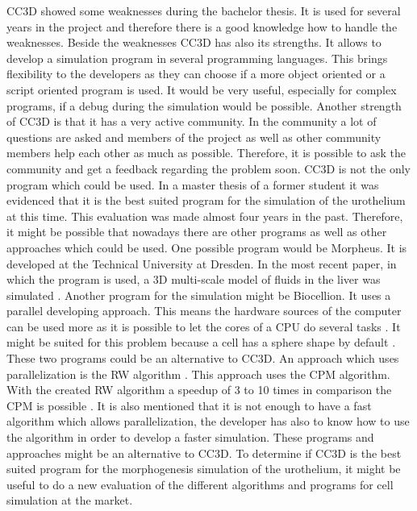 \ac{CC3D} showed some weaknesses during the bachelor thesis. It is used for several years in the project and therefore there is a good knowledge how to handle the weaknesses. Beside the weaknesses \ac{CC3D} has also its strengths. It allows to develop a simulation program in several programming languages.  This brings flexibility to the developers as they can choose if a more object oriented or a script oriented program is used. It would be very useful, especially for complex programs, if a debug during the simulation would be possible. Another strength of \ac{CC3D} is that it has a very active community. In the community a lot of questions are asked and members of the project as well as other community members help each other as much as possible. Therefore, it is possible to ask the community and get a feedback regarding the problem soon. \newline
\ac{CC3D} is not the only program which could be used. In a master thesis of a former student it was evidenced that it is the best suited program for the simulation of the urothelium \cite{MSCAngelo} at this time. This evaluation was made almost four years in the past. Therefore, it might be possible that nowadays there are other programs as well as other approaches which could be used. One possible program would be Morpheus. It is developed at the Technical University at Dresden. In the most recent paper, in which the program is used, a 3D multi-scale model of fluids in the liver was simulated \cite{Meyer2017}. Another program for the simulation might be Biocellion. It uses a parallel developing approach. This means the hardware sources of the computer can be used more as it is possible to let the cores of a CPU do several tasks \cite{Kang2014}. It might be suited for this problem because a cell has a sphere shape by default \cite{Kang2014}. These two programs could be an alternative to \ac{CC3D}. \newline
An approach which uses parallelization is the \ac{RW} algorithm \cite{Cercato2006}. This approach uses the \ac{CPM} algorithm. With the created \ac{RW} algorithm a speedup of 3 to 10 times in comparison the \ac{CPM} is possible \cite{Cercato2006}. It is also mentioned that it is not enough to have a fast algorithm which allows parallelization, the developer has also to know how to use the algorithm in order to develop a faster simulation. \newline
These programs and approaches might be an alternative to \ac{CC3D}. To determine if \ac{CC3D} is the best suited program for the morphogenesis simulation of the urothelium, it might be useful to do a new evaluation of the different algorithms and programs for cell simulation at the market.



